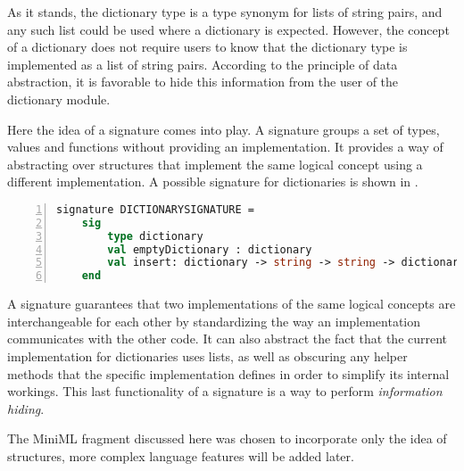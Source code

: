 As it stands, the dictionary type is a type synonym for lists of string pairs, and any such list could be used where a dictionary is expected.
However, the concept of a dictionary does not require users to know that the dictionary type is implemented as a list of string pairs.
According to the principle of data abstraction, it is favorable to hide this information from the user of the dictionary module.

Here the idea of a signature comes into play.
A signature groups a set of types, values and functions without providing an implementation.
It provides a way of abstracting over structures that implement the same logical concept using a different implementation.
A possible signature for dictionaries is shown in .
~
\begin{lstlisting}[frame=single, language=ML, caption={[Dictionary Declaration Example]An example signature showing the declaration of a dictionary in ML.}, label=code:SignatureDictionaryExample, numbers=left]
signature DICTIONARYSIGNATURE =
    sig
        type dictionary
        val emptyDictionary : dictionary
        val insert: dictionary -> string -> string -> dictionary
    end
\end{lstlisting}

A signature guarantees that two implementations of the same logical concepts are interchangeable for each other by standardizing the way an implementation communicates with the other code.
It can also abstract the fact that the current implementation for dictionaries uses lists, as well as obscuring any helper methods that the specific implementation defines in order to simplify its internal workings.
This last functionality of a signature is a way to perform \emph{information hiding}.


The \mbox{MiniML} fragment discussed here was chosen to incorporate only the idea of structures, more complex language features will be added later.

